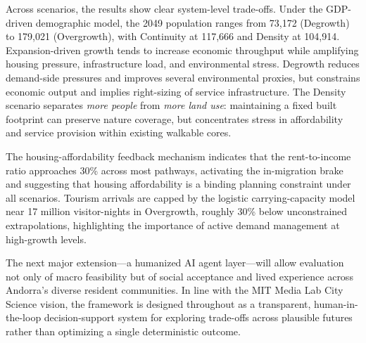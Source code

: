 \documentclass{article}
\begin{document}
Across scenarios, the results show clear system-level trade-offs. Under the
GDP-driven demographic model, the 2049 population ranges from 73{,}172
(Degrowth) to 179{,}021 (Overgrowth), with Continuity at 117{,}666 and Density
at 104{,}914. Expansion-driven growth tends to increase economic throughput
while amplifying housing pressure, infrastructure load, and environmental stress.
Degrowth reduces demand-side pressures and improves several environmental
proxies, but constrains economic output and implies right-sizing of service
infrastructure. The Density scenario separates \emph{more people} from
\emph{more land use}: maintaining a fixed built footprint can preserve nature
coverage, but concentrates stress in affordability and service provision within
existing walkable cores.

The housing-affordability feedback mechanism indicates that the rent-to-income
ratio approaches 30\% across most pathways, activating the in-migration brake
and suggesting that housing affordability is a binding planning constraint under
all scenarios. Tourism arrivals are capped by the logistic carrying-capacity
model near 17 million visitor-nights in Overgrowth, roughly 30\% below
unconstrained extrapolations, highlighting the importance of active demand
management at high-growth levels.

The next major extension---a humanized AI agent layer---will allow evaluation
not only of macro feasibility but of social acceptance and lived experience
across Andorra's diverse resident communities. In line with the MIT Media Lab
City Science vision, the framework is designed throughout as a transparent,
human-in-the-loop decision-support system for exploring trade-offs across
plausible futures rather than optimizing a single deterministic outcome.



\end{document}
